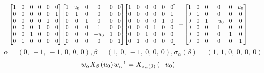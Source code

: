 \documentclass[11pt]{article}
\theoremstyle{definition}
\begin{document}
\[
\scaletoalign{\textwidth}{{\left[\begin{matrix}1 & 0 & 0 & 0 & 0 & 0\\0 & 0 & 0 & 0 & 0 & 1\\0 & 0 & 0 & 0 & 1 & 0\\0 & 0 & 0 & 1 & 0 & 0\\0 & 0 & 1 & 0 & 0 & 0\\0 & 1 & 0 & 0 & 0 & 0\end{matrix}\right]} {\left[\begin{matrix}1 & u_{0} & 0 & 0 & 0 & 0\\0 & 1 & 0 & 0 & 0 & 0\\0 & 0 & 1 & 0 & 0 & 0\\0 & 0 & 0 & 1 & 0 & 0\\0 & 0 & 0 & - u_{0} & 1 & 0\\0 & 0 & 0 & 0 & 0 & 1\end{matrix}\right]} {\left[\begin{matrix}1 & 0 & 0 & 0 & 0 & 0\\0 & 0 & 0 & 0 & 0 & 1\\0 & 0 & 0 & 0 & 1 & 0\\0 & 0 & 0 & 1 & 0 & 0\\0 & 0 & 1 & 0 & 0 & 0\\0 & 1 & 0 & 0 & 0 & 0\end{matrix}\right]} = {\left[\begin{matrix}1 & 0 & 0 & 0 & 0 & u_{0}\\0 & 1 & 0 & 0 & 0 & 0\\0 & 0 & 1 & - u_{0} & 0 & 0\\0 & 0 & 0 & 1 & 0 & 0\\0 & 0 & 0 & 0 & 1 & 0\\0 & 0 & 0 & 0 & 0 & 1\end{matrix}\right]}}
\]
\[
\alpha = \left( 0, \  -1, \  -1, \  0, \  0, \  0\right), \beta = \left( 1, \  0, \  -1, \  0, \  0, \  0\right), \sigma_{\alpha}(\beta) = \left( 1, \  1, \  0, \  0, \  0, \  0\right)
\]
\[
\scaletoalign{\textwidth}{w_{\alpha} X_{\beta}\left(u_{0}\right) w_{\alpha}^{-1} = X_{\sigma_{\alpha}\left(\beta\right)}\left(- u_{0}\right)}
\]
\end{document}
